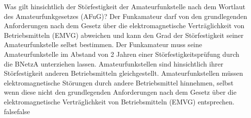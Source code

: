     {Was gilt hinsichtlich der Störfestigkeit der Amateurfunkstelle nach dem Wortlaut des Amateurfunkgesetzes (AFuG)? }
    {Der Funkamateur darf von den grundlegenden Anforderungen nach dem Gesetz über die elektromagnetische Verträglichkeit von Betriebsmitteln (EMVG) abweichen und kann den Grad der Störfestigkeit seiner Amateurfunkstelle selbst bestimmen.}
    {Der Funkamateur muss seine Amateurfunkstelle im Abstand von 2 Jahren einer Störfestigkeitsprüfung durch die BNetzA unterziehen lassen.}
    {Amateurfunkstellen sind hinsichtlich ihrer Störfestigkeit anderen Betriebsmitteln gleichgestellt.}
    {Amateurfunkstellen müssen elektromagnetische Störungen durch andere Betriebsmittel hinnehmen, selbst wenn diese nicht den grundlegenden Anforderungen nach dem Gesetz über die elektromagnetische Verträglichkeit von Betriebsmitteln (EMVG) entsprechen.}
    {false}{false}
